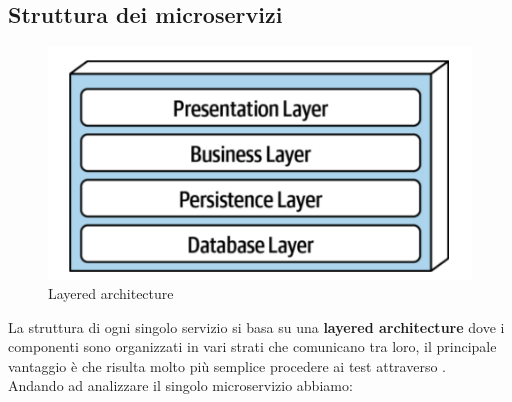 \subsection{Struttura dei microservizi}\label{StrutturaMicroservizi}
\begin{figure}[H]
	\centering
	\includegraphics[scale=0.4]{Immagini/Backend/layer.png}
	\caption{Layered architecture}
	\label{fig:layer}
\end{figure}
La struttura di ogni singolo servizio si basa su una \textbf{layered architecture} dove i componenti sono organizzati in vari strati che comunicano tra loro, il principale vantaggio è che risulta molto più semplice procedere ai test attraverso .\\
Andando ad analizzare il singolo microservizio abbiamo:
